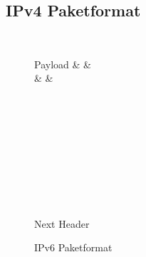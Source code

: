 \documentclass[a4paper, 11pt, accentcolor = tud3b]{tudreport}
\begin{document}
            \subsection{IPv4 Paketformat}
	            \begin{figure}[H]
	            	\centering
	                \begin{bytefield}[bitwidth = 1.2em]{32}
			             \\
			            \begin{rightwordgroup}{Payload}
				             &  &  \\
				             &  &  \\
				             \\
				             \\
				             \\
				             \\
				             \\
				             \\
				             \\
				        \end{rightwordgroup} \\
			            \begin{rightwordgroup}{Next Header}
			            \end{rightwordgroup}
	                \end{bytefield}
	                \caption{IPv6 Paketformat}
	                \label{fig:ipv6_packet}
	            \end{figure}
	            
\end{document}
